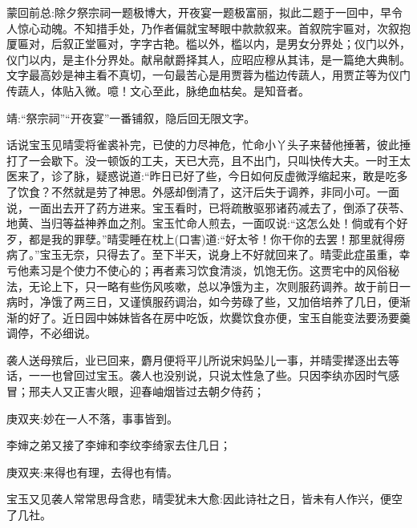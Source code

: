 

\begin{parag}
    \begin{note}蒙回前总:除夕祭宗祠一题极博大，开夜宴一题极富丽，拟此二题于一回中，早令人惊心动魄。不知措手处，乃作者偏就宝琴眼中款款叙来。首叙院宇匾对，次叙抱厦匾对，后叙正堂匾对，字字古艳。槛以外，槛以内，是男女分界处；仪门以外，仪门以内，是主仆分界处。献帛献爵择其人，应昭应穆从其讳，是一篇绝大典制。文字最高妙是神主看不真切，一句最苦心是用贾蓉为槛边传蔬人，用贾芷等为仪门传蔬人，体贴入微。噫！文心至此，脉绝血枯矣。是知音者。\end{note}
\end{parag}


\begin{parag}
    \begin{note}靖:“祭宗祠”“开夜宴”一番铺叙，隐后回无限文字。\end{note}
\end{parag}


\begin{parag}
    话说宝玉见晴雯将雀裘补完，已使的力尽神危，忙命小丫头子来替他捶著，彼此捶打了一会歇下。没一顿饭的工夫，天已大亮，且不出门，只叫快传大夫。一时王太医来了，诊了脉，疑惑说道:“昨日已好了些，今日如何反虚微浮缩起来，敢是吃多了饮食？不然就是劳了神思。外感却倒清了，这汗后失于调养，非同小可。一面说，一面出去开了药方进来。宝玉看时，已将疏散驱邪诸药减去了，倒添了茯苓、地黄、当归等益神养血之剂。宝玉忙命人煎去，一面叹说:“这怎么处！倘或有个好歹，都是我的罪孽。”晴雯睡在枕上(口害)道:“好太爷！你干你的去罢！那里就得痨病了。”宝玉无奈，只得去了。至下半天，说身上不好就回来了。晴雯此症虽重，幸亏他素习是个使力不使心的；再者素习饮食清淡，饥饱无伤。这贾宅中的风俗秘法，无论上下，只一略有些伤风咳嗽，总以净饿为主，次则服药调养。故于前日一病时，净饿了两三日，又谨慎服药调治，如今劳碌了些，又加倍培养了几日，便渐渐的好了。近日园中姊妹皆各在房中吃饭，炊爨饮食亦便，宝玉自能变法要汤要羹调停，不必细说。
\end{parag}


\begin{parag}
    袭人送母殡后，业已回来，麝月便将平儿所说宋妈坠儿一事，并晴雯撵逐出去等话，一一也曾回过宝玉。袭人也没别说，只说太性急了些。只因李纨亦因时气感冒；邢夫人又正害火眼，迎春岫烟皆过去朝夕侍药；\begin{note}庚双夹:妙在一人不落，事事皆到。\end{note}李婶之弟又接了李婶和李纹李绮家去住几日；\begin{note}庚双夹:来得也有理，去得也有情。\end{note}宝玉又见袭人常常思母含悲，晴雯犹未大愈:因此诗社之日，皆未有人作兴，便空了几社。
\end{parag}


